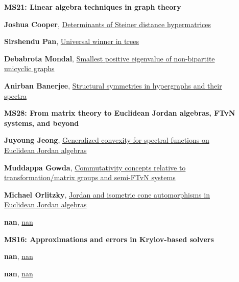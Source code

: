 \documentclass[ILAS2025-program.tex]{subfiles}
\begin{document}
\begin{description}
    \begin{description}
    \item[] {\color{mstitle}\textbf{MS21: Linear algebra techniques in graph theory}} 
    \item[] \hypertarget{up0379}{}\textbf{Joshua Cooper}, \hyperlink{down0379}{Determinants of Steiner distance hypermatrices}
        \item[] \hypertarget{up0380}{}\textbf{Sirshendu Pan}, \hyperlink{down0380}{Universal winner in trees}
        \item[] \hypertarget{up0381}{}\textbf{Debabrota Mondal}, \hyperlink{down0381}{Smallest positive eigenvalue of non-bipartite unicyclic graphs}
        \item[] \hypertarget{up0382}{}\textbf{Anirban Banerjee}, \hyperlink{down0382}{Structural symmetries in hypergraphs and their spectra}
        \end{description}
    \begin{description}
    \item[] {\color{mstitle}\textbf{MS28: From matrix theory to Euclidean Jordan algebras, FTvN systems, and beyond}} 
    \item[] \hypertarget{up0383}{}\textbf{Juyoung Jeong}, \hyperlink{down0383}{Generalized convexity for spectral functions on Euclidean Jordan algebras
}
        \item[] \hypertarget{up0384}{}\textbf{Muddappa Gowda}, \hyperlink{down0384}{Commutativity concepts relative to transformation/matrix groups and semi-FTvN systems}
        \item[] \hypertarget{up0385}{}\textbf{Michael Orlitzky}, \hyperlink{down0385}{Jordan and isometric cone automorphisms in Euclidean Jordan algebras}
        \item[] \hypertarget{up0386}{}\textbf{nan}, \hyperlink{down0386}{nan}
        \end{description}
    \begin{description}
    \item[] {\color{mstitle}\textbf{MS16: Approximations and errors in Krylov-based solvers}} 
    \item[] \hypertarget{up0387}{}\textbf{nan}, \hyperlink{down0387}{nan}
        \item[] \hypertarget{up0388}{}\textbf{nan}, \hyperlink{down0388}{nan}

\end{description}
\end{description}
\end{document}
